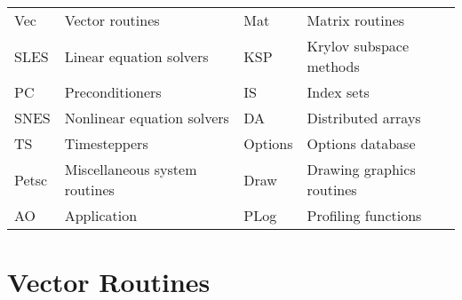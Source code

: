 %
%

\label{routines}

\def\tightboxit#1{\vbox{\hsize=6.6in \hrule\hbox{\vrule\vbox{\hbox{#1}}\vrule
\hss}\hrule}}
\def\k#1#2#3{\tightboxit{
    \parindent=0pt\hskip.3in\begin{tabular}{l} #2 \\ #3 \end{tabular}}}
\def\CoDe#1{
    \parbox[t]{6.0in}{\raggedright \parindent=-0.4in {\bf #1}}\break}
\def\DeFn#1{
    \parbox[t]{6.0in}{\raggedright #1 \vskip2pt}\break}



\vspace{.2cm}

\begin{tabular}{llll}
Vec&Vector routines&Mat&Matrix routines\\
SLES&Linear equation solvers& KSP&Krylov subspace methods\\
PC&Preconditioners&IS&Index sets\\
SNES & Nonlinear equation solvers&DA& Distributed arrays \\
TS   & Timesteppers & Options & Options database \\
Petsc & Miscellaneous system routines & Draw & Drawing graphics routines\\
AO & Application & PLog & Profiling functions \\
\end{tabular}

\section{Vector Routines}

